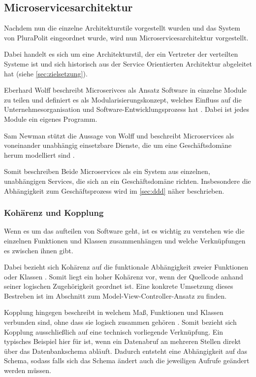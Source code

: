 \subsection{Microservicesarchitektur}
\label{sec:microservices}

Nachdem nun die einzelne Architekturstile vorgestellt wurden und das System von PluraPolit eingeordnet wurde, wird nun Microservicesarchitektur vorgestellt.

Dabei handelt es sich um eine Architekturstil, der ein Vertreter der verteilten Systeme ist und sich historisch aus der Service Orientierten Architektur abgeleitet hat (siehe \cref{sec:zielsetzung}).

Eberhard Wolff beschreibt Microserivces als Ansatz Software in einzelne Module zu teilen und definiert es als Modularisierungskonzept, welches Einfluss auf die Unternehmesorganisation und Software-Entwicklungsprozess hat \parencite[vgl.][Kap. 1.1]{wolff_microservices_2018}. Dabei ist jedes Module ein eigenes Programm.

Sam Newman stützt die Aussage von Wolff und beschreibt Microservices als voneinander unabhängig einsetzbare Dienste, die um eine Geschäftsdomäne herum modelliert sind \parencite[vgl.][Kap. 2.1]{newman_monolith_2019}.

Somit beschreiben Beide Microservices als ein System aus einzelnen, unabhängigen Services, die sich an ein Geschäftsdomäne richten. Insbesondere die Abhängigkeit zum Geschäftsprozess wird im \cref{sec:ddd} näher beschrieben.

\subsubsection{Kohärenz und Kopplung}

Wenn es um das aufteilen von Software geht, ist es wichtig zu verstehen wie die einzelnen Funktionen und Klassen zusammenhängen und welche Verknüpfungen es zwischen ihnen gibt.

Dabei bezieht sich Kohärenz auf die funktionale Abhängigkeit zweier Funktionen oder Klassen \parencite[vgl.][Kap. 2.3.1]{newman_monolith_2019}. Somit liegt ein hoher Kohärenz vor, wenn der Quellcode anhand seiner logischen Zugehörigkeit geordnet ist. Eine konkrete Umsetzung dieses Bestreben ist im Abschnitt zum Model-View-Controller-Ansatz zu finden.

Kopplung hingegen beschreibt in welchem Maß, Funktionen und Klassen verbunden sind, ohne dass sie logisch zusammen gehören \parencite[vgl.][Kap. 2.3.2]{newman_monolith_2019}. Somit bezieht sich Kopplung ausschließlich auf eine technisch vorliegende Verknüpfung. Ein typisches Beispiel hier für ist, wenn ein Datenabruf an mehreren Stellen direkt über das Datenbankschema abläuft. Dadurch entsteht eine Abhängigkeit auf das Schema, sodass falls sich das Schema ändert auch die jeweiligen Aufrufe geändert werden müssen.

